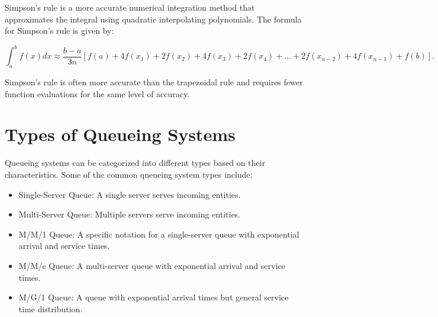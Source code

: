 Simpson's rule is a more accurate numerical integration method that approximates the integral using quadratic interpolating polynomials. The formula for Simpson's rule is given by:

\begin{equation}
\int_{a}^{b} f(x) dx \approx \frac{b - a}{3n} \left[f(a) + 4f(x_1) + 2f(x_2) + 4f(x_3) + 2f(x_4) + \ldots + 2f(x_{n-2}) + 4f(x_{n-1}) + f(b)\right].
\end{equation}

Simpson's rule is often more accurate than the trapezoidal rule and requires fewer function evaluations for the same level of accuracy.

\section{Types of Queueing Systems}

Queueing systems can be categorized into different types based on their characteristics. Some of the common queueing system types include:

\begin{itemize}
\item Single-Server Queue: A single server serves incoming entities.
\item Multi-Server Queue: Multiple servers serve incoming entities.
\item M/M/1 Queue: A specific notation for a single-server queue with exponential arrival and service times.
\item M/M/c Queue: A multi-server queue with exponential arrival and service times.
\item M/G/1 Queue: A queue with exponential arrival times but general service time distribution.
\end{itemize}
